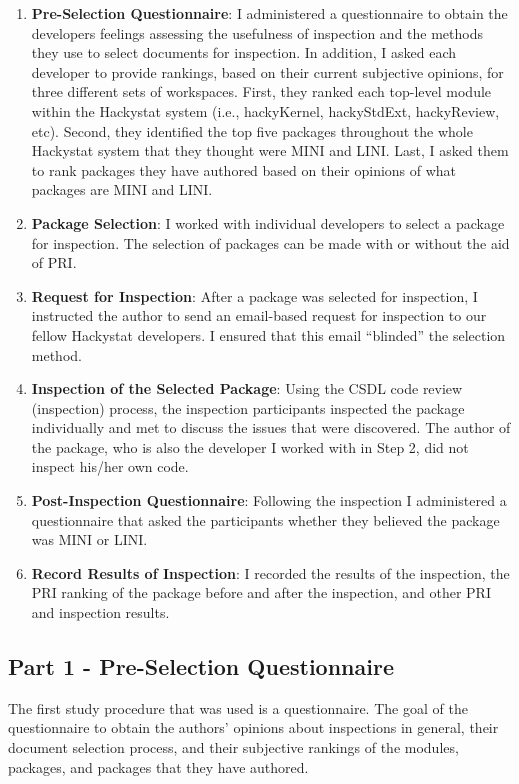 \begin{enumerate}
\item \textbf{Pre-Selection Questionnaire}: I administered a questionnaire
  to obtain the developers feelings assessing the usefulness of inspection
  and the methods they use to select documents for inspection.  In
  addition, I asked each developer to provide rankings, based on their
  current subjective opinions, for three different sets of workspaces.
  First, they ranked each top-level module within the Hackystat system
  (i.e., hackyKernel, hackyStdExt, hackyReview, etc). Second, they
  identified the top five packages throughout the whole Hackystat system
  that they thought were MINI and LINI. Last, I asked them to rank packages
  they have authored based on their opinions of what packages are MINI and
  LINI.
\item \textbf{Package Selection}: I worked with individual developers to
  select a package for inspection. The selection of packages can be made
  with or without the aid of PRI.
\item \textbf{Request for Inspection}: After a package was selected for
  inspection, I instructed the author to send an email-based request for
  inspection to our fellow Hackystat developers. I ensured that this email
  ``blinded'' the selection method.
\item \textbf{Inspection of the Selected Package}: Using the CSDL code
  review (inspection) process, the inspection participants inspected the
  package individually and met to discuss the issues that were discovered.
  The author of the package, who is also the developer I worked with in
  Step 2, did not inspect his/her own code.
\item \textbf{Post-Inspection Questionnaire}: Following the inspection I
  administered a questionnaire that asked the participants whether they
  believed the package was MINI or LINI.
\item \textbf{Record Results of Inspection}: I recorded the results of the
  inspection, the PRI ranking of the package before and after the
  inspection, and other PRI and inspection results.
\end{enumerate}




\subsection{Part 1 - Pre-Selection Questionnaire}
\label{subsection:pre-selection-questionnaire}
The first study procedure that was used is a questionnaire. The goal of the
questionnaire to obtain the authors' opinions about inspections in general,
their document selection process, and their subjective rankings of the
modules, packages, and packages that they have authored.

